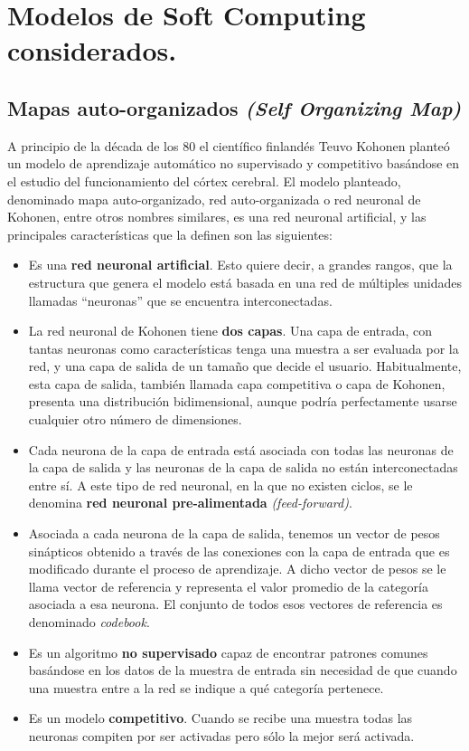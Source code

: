 ﻿%
\chapter{Modelos de Soft Computing considerados.}
\section{Mapas auto-organizados \textit{(Self Organizing Map)}}
A principio de la década de los 80 el científico finlandés Teuvo Kohonen \cite{kohonensom} planteó un modelo de aprendizaje automático no supervisado y competitivo basándose en el estudio del funcionamiento del córtex cerebral. El modelo planteado, denominado mapa auto-organizado, red auto-organizada o red neuronal de Kohonen, entre otros nombres similares, es una red neuronal artificial, y las principales características que la definen son las siguientes:\\

\begin{itemize}
	\item Es una \textbf{red neuronal artificial}. Esto quiere decir, a grandes rangos, que la estructura que genera el modelo está basada en una red de múltiples unidades llamadas ``neuronas'' que se encuentra interconectadas.
	
	\item La red neuronal de Kohonen tiene \textbf{dos capas}. Una capa de entrada, con tantas neuronas como características tenga una muestra a ser evaluada por la red, y una capa de salida de un tamaño que decide el usuario. Habitualmente, esta capa de salida, también llamada capa competitiva o capa de Kohonen, presenta una distribución bidimensional, aunque podría perfectamente usarse cualquier otro número de dimensiones.

	\item Cada neurona de la capa de entrada está asociada con todas las neuronas de la capa de salida y las neuronas de la capa de salida no están interconectadas entre sí. A este tipo de red neuronal, en la que no existen ciclos, se le denomina \textbf{red neuronal pre-alimentada} \textit{(feed-forward)}.

	\item Asociada a cada neurona de la capa de salida, tenemos un vector de pesos sinápticos obtenido a través de las conexiones con la capa de entrada que es modificado durante el proceso de aprendizaje. A dicho vector de pesos se le llama vector de referencia y representa el valor promedio de la categoría asociada a esa neurona. El conjunto de todos esos vectores de referencia es denominado \textit{codebook}.

	\item Es un algoritmo \textbf{no supervisado} capaz de encontrar patrones comunes basándose en los datos de la muestra de entrada sin necesidad de que cuando una muestra entre a la red se indique a qué categoría pertenece.

	\item Es un modelo \textbf{competitivo}. Cuando se recibe una muestra todas las neuronas compiten por ser activadas pero sólo la mejor será activada.
\end{itemize}

